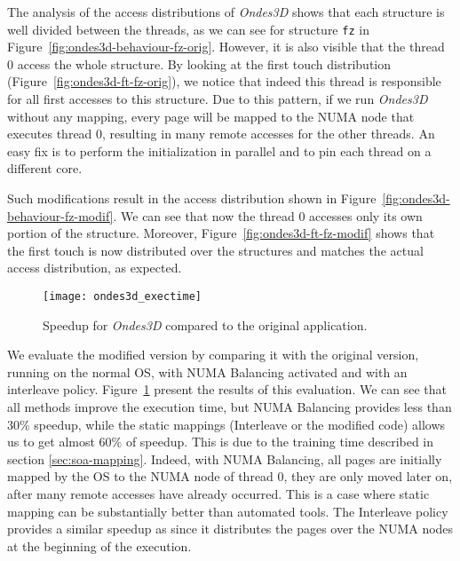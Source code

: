 The analysis of the access distributions of \emph{Ondes3D} shows that each
structure is well divided between the threads, as we can see for structure \texttt{fz} in Figure~\ref{fig:ondes3d-behaviour-fz-orig}.
However, it is also visible that the thread $0$ access the whole structure. By looking at the first touch distribution (Figure~\ref{fig:ondes3d-ft-fz-orig}), we
notice that indeed this thread is responsible for all first accesses to this structure. Due to
this pattern, if we run \emph{Ondes3D} without any mapping, every page
will be mapped to the NUMA node that executes thread $0$, resulting in many remote accesses for the other threads. An easy fix is to
perform the initialization in parallel and to pin each thread on a different core.



Such modifications result in the access distribution shown in
Figure~\ref{fig:ondes3d-behaviour-fz-modif}. We can see that now the thread $0$ accesses only
its own portion of the structure. Moreover, Figure~\ref{fig:ondes3d-ft-fz-modif} shows that the first touch is now distributed
over the structures and matches the actual access distribution, as expected.

\begin{figure}[htb]
    \centering
    \texttt{[image: ondes3d\_exectime]}
    \caption{Speedup for \emph{Ondes3D} compared to the original application.}
\label{fig:ondes-res}
\end{figure}

We evaluate the modified version by comparing it with the original
version, running on the normal OS, with NUMA Balancing activated and with an
interleave policy. Figure~\ref{fig:ondes-res} present the results of this
evaluation. We can see that all methods improve the execution time, but
NUMA Balancing provides less than $30\%$ speedup, while the static mappings
(Interleave or the modified code) allows us to get almost $60\%$ of speedup. This is
due to the training time described in section \ref{sec:soa-mapping}. Indeed,
with NUMA Balancing, all pages are initially mapped by the OS to the NUMA node of thread $0$, they
are only moved later on, after many remote accesses have already occurred. This is a case where static mapping can be substantially better than automated
tools. The Interleave policy provides a similar speedup as
\TABARNAC since it distributes the pages over the NUMA nodes at the beginning of
the execution.


